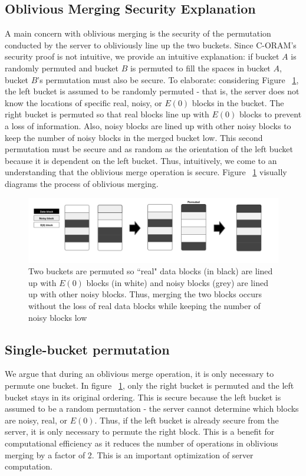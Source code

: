 \documentclass[12pt, oneside]{article}   	%
\begin{document}
\subsection{Oblivious Merging Security Explanation}
A main concern with oblivious merging is the security of the permutation conducted by the server to obliviously line up the two buckets. Since C-ORAM's security proof is not intuitive, we provide an intuitive explanation: if bucket $A$ is randomly permuted and bucket $B$ is permuted to fill the spaces in bucket $A$, bucket $B$'s permutation must also be secure. To elaborate: considering Figure ~\ref{fig:merge}, the left bucket is assumed to be randomly permuted - that is, the server does not know the locations of specific real, noisy, or $E (0)$ blocks in the bucket. The right bucket is permuted so that real blocks line up with $E (0)$ blocks to prevent a loss of information. Also, noisy blocks are lined up with other noisy blocks to keep the number of noisy blocks in the merged bucket low. This second permutation must be secure and as random as the orientation of the left bucket because it is dependent on the left bucket. Thus, intuitively, we come to an understanding that the oblivious merge operation is secure. Figure ~\ref{fig:merge} visually diagrams the process of oblivious merging.

\begin{figure}[h!]
  \includegraphics[width=\linewidth]{merge}
  \caption{Two buckets are permuted so ``real" data blocks (in black) are lined up with $E (0)$ blocks (in white) and noisy blocks (grey) are lined up with other noisy blocks. Thus, merging the two blocks occurs without the loss of real data blocks while keeping the number of noisy blocks low}
  \label{fig:merge}
\end{figure}

\subsection{Single-bucket permutation}
We argue that during an oblivious merge operation, it is only necessary to permute one bucket. In figure ~\ref{fig:merge}, only the right bucket is permuted and the left bucket stays in its original ordering. This is secure because the left bucket is assumed to be a random permutation - the server cannot determine which blocks are noisy, real, or $ E (0) $. Thus, if the left bucket is already secure from the server, it is only necessary to permute the right block. This is a benefit for computational efficiency as it reduces the number of operations in oblivious merging by a factor of 2. This is an important optimization of server computation.
\end{document}
